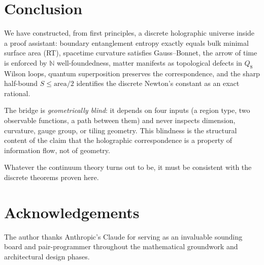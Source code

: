 \documentclass[11pt,a4paper]{article}
\newcommand{\N}{\mathbb{N}}
\begin{document}
\section{Conclusion}
\label{sec:conclusion}

We have constructed, from first principles, a discrete holographic
universe inside a proof assistant: boundary entanglement entropy
exactly equals bulk minimal surface area (RT), spacetime curvature
satisfies Gauss--Bonnet, the arrow of time is enforced by $\N$
well-foundedness, matter manifests as topological defects in $Q_8$
Wilson loops, quantum superposition preserves the correspondence,
and the sharp half-bound $S \leq \mathrm{area}/2$ identifies the
discrete Newton's constant as an exact rational.

The bridge is \emph{geometrically blind}: it depends on four inputs
(a region type, two observable functions, a path between them) and
never inspects dimension, curvature, gauge group, or tiling
geometry.  This blindness is the structural content of the claim
that the holographic correspondence is a property of information
flow, not of geometry.

Whatever the continuum theory turns out to be, it must be consistent
with the discrete theorems proven here.

\section*{Acknowledgements}

The author thanks Anthropic's Claude for serving as an invaluable
sounding board and pair-programmer throughout the mathematical
groundwork and architectural design phases.


\end{document}
